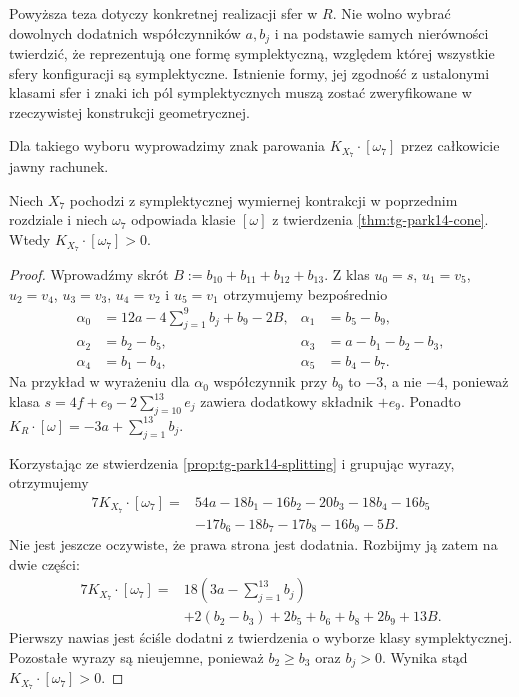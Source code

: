 \begin{uwaga}
Powyższa teza dotyczy konkretnej realizacji sfer w $R$.
Nie wolno wybrać dowolnych dodatnich współczynników
$a,b_j$ i na podstawie samych nierówności twierdzić,
że reprezentują one formę symplektyczną, względem której
wszystkie sfery konfiguracji są symplektyczne.
Istnienie formy, jej zgodność z ustalonymi klasami sfer
i znaki ich pól symplektycznych muszą zostać zweryfikowane
w rzeczywistej konstrukcji geometrycznej.
\end{uwaga}

Dla takiego wyboru wyprowadzimy znak parowania
$K_{X_7}\cdot[\omega_7]$ przez całkowicie jawny rachunek.

\begin{twierdzenie}
\label{thm:tg-park14-positive}
Niech $X_7$ pochodzi z symplektycznej wymiernej kontrakcji
w poprzednim rozdziale i niech $\omega_7$ odpowiada klasie
$[\omega]$ z twierdzenia \ref{thm:tg-park14-cone}.
Wtedy $K_{X_7}\cdot[\omega_7]>0$.
\end{twierdzenie}

\begin{proof}
Wprowadźmy skrót $B:=b_{10}+b_{11}+b_{12}+b_{13}$.
Z klas $u_0=s$, $u_1=v_5$, $u_2=v_4$, $u_3=v_3$,
$u_4=v_2$ i $u_5=v_1$ otrzymujemy bezpośrednio
\[
\begin{aligned}
\alpha_0&=12a-4\sum_{j=1}^{9}b_j+b_9-2B,
 &\alpha_1&=b_5-b_9,\\
\alpha_2&=b_2-b_5,
 &\alpha_3&=a-b_1-b_2-b_3,\\
\alpha_4&=b_1-b_4,
 &\alpha_5&=b_4-b_7.
\end{aligned}
\]
Na przykład w wyrażeniu dla $\alpha_0$ współczynnik
przy $b_9$ to $-3$, a nie $-4$, ponieważ klasa
$s=4f+e_9-2\sum_{j=10}^{13}e_j$ zawiera dodatkowy
składnik $+e_9$. Ponadto
$K_R\cdot[\omega]=-3a+\sum_{j=1}^{13}b_j$.

Korzystając ze stwierdzenia \ref{prop:tg-park14-splitting}
i grupując wyrazy, otrzymujemy
\[
\begin{aligned}
7K_{X_7}\cdot[\omega_7]
={}&54a-18b_1-16b_2-20b_3-18b_4-16b_5\\
 &-17b_6-18b_7-17b_8-16b_9-5B.
\end{aligned}
\]
Nie jest jeszcze oczywiste, że prawa strona jest dodatnia.
Rozbijmy ją zatem na dwie części:
\[
\begin{aligned}
7K_{X_7}\cdot[\omega_7]
={}&18\left(3a-\sum_{j=1}^{13}b_j\right)\\
 &+2(b_2-b_3)+2b_5+b_6+b_8+2b_9+13B.
\end{aligned}
\]
Pierwszy nawias jest ściśle dodatni z twierdzenia
o wyborze klasy symplektycznej. Pozostałe wyrazy
są nieujemne, ponieważ $b_2\ge b_3$ oraz $b_j>0$.
Wynika stąd $K_{X_7}\cdot[\omega_7]>0$.
\end{proof}

